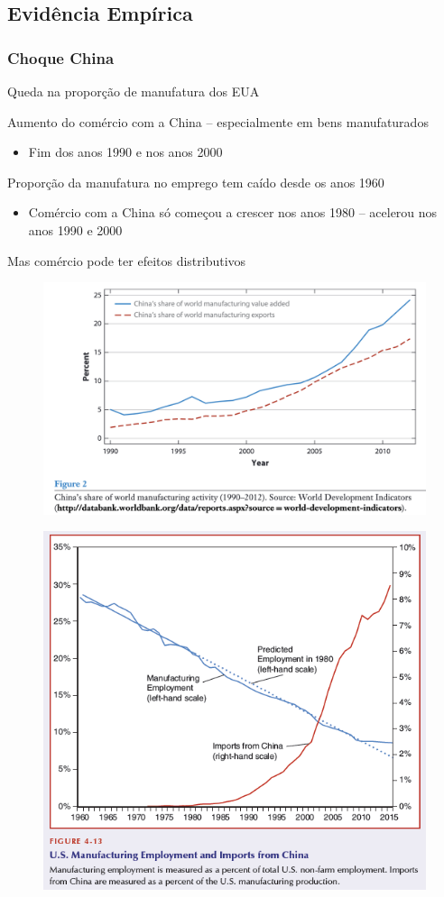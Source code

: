\documentclass[a4paper,12pt]{article}[abntex2]
\begin{document}
\subsection{\textbf{Evidência Empírica}}
\subsubsection{\textbf{Choque China}}
Queda na proporção de manufatura dos EUA

Aumento do comércio com a China – especialmente em bens manufaturados\begin{itemize}
    \item Fim dos anos 1990 e nos anos 2000
\end{itemize}

Proporção da manufatura no emprego tem caído desde os anos 1960\begin{itemize}
    \item Comércio com a China só começou a crescer nos anos 1980 – acelerou nos anos 1990 e 2000
\end{itemize}

Mas comércio pode ter efeitos distributivos

\begin{figure}[H]
    \centering
    \includegraphics[width=0.7\linewidth]{Imagens/a15i1.png}
\end{figure}

\begin{figure}[H]
    \centering
    \includegraphics[width=0.7\linewidth]{Imagens/a15i2.png}
\end{figure}
\end{document}
